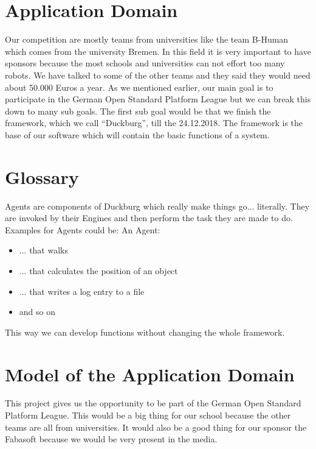\documentclass[12pt]{article}
\theoremstyle{definition}
\begin{document}
\pagebreak

\section{Application Domain}

Our competition are mostly teams from universities like the team B-Human which comes from the university Bremen. In this field it is very important to have sponsors because the most schools and universities can not effort too many robots. We have talked to some of the other teams and they said they would need about 50.000 Euros a year. 
As we mentioned earlier, our main goal is to participate in the German Open Standard Platform League but we can break this down to many sub goals. The first sub goal would be that we finish the framework, which we call “Duckburg”, till the 24.12.2018. The framework is the base of our software which will  contain the basic functions of a system. 

\pagebreak

\section{Glossary}



\pagebreak



Agents are components of Duckburg which really make things go... literally. They are invoked by their Engines and then perform the task they are made to do. Examples for Agents could be: An Agent:
\begin{itemize}
\item ... that walks
\item ... that calculates the position of an object 
\item ... that writes a log entry to a file
\item and so on
\end{itemize}
This way we can develop functions without changing the whole framework.\linebreak

\pagebreak
\section{Model of the Application Domain}

This project gives us the opportunity to be part of the German Open Standard Platform League. This would be a big thing for our school because the other teams are all from universities. It would also be a good thing for our sponsor the Fabasoft because we would be very present in the media. \newline
\end{document}
